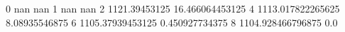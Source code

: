 0 nan nan
1 nan nan
2 1121.39453125 16.466064453125
4 1113.017822265625 8.08935546875
6 1105.37939453125 0.450927734375
8 1104.928466796875 0.0
